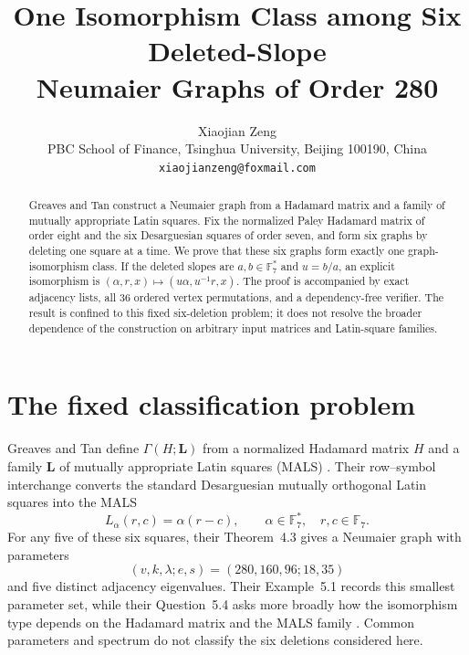 \documentclass[11pt]{article}
\title{One Isomorphism Class among Six Deleted-Slope\\
Neumaier Graphs of Order 280}
\author{Xiaojian Zeng\\
\small PBC School of Finance, Tsinghua University, Beijing 100190, China\\
\small \texttt{xiaojianzeng@foxmail.com}}
\date{}\hypersetup{pdftitle={One Isomorphism Class among Six Deleted-Slope Neumaier Graphs of Order 280},pdfauthor={Xiaojian Zeng}}
\newcommand{\F}{\mathbb F}
\begin{document}
\maketitle

\begin{abstract}
Greaves and Tan construct a Neumaier graph from a Hadamard matrix and a
family of mutually appropriate Latin squares.  Fix the normalized Paley
Hadamard matrix of order eight and the six Desarguesian squares of order
seven, and form six graphs by deleting one square at a time.  We prove that
these six graphs form exactly one graph-isomorphism class.  If the deleted
slopes are $a,b\in\F_7^*$ and $u=b/a$, an explicit isomorphism is
$(\alpha,r,x)\mapsto(u\alpha,u^{-1}r,x)$.  The proof is accompanied by exact
adjacency lists, all 36 ordered vertex permutations, and a dependency-free
verifier.  The result is confined to this fixed six-deletion problem; it does
not resolve the broader dependence of the construction on arbitrary input
matrices and Latin-square families.
\end{abstract}

\section{The fixed classification problem}

Greaves and Tan define $\Gamma(H;\mathbf L)$ from a normalized Hadamard
matrix $H$ and a family $\mathbf L$ of mutually appropriate Latin squares
(MALS) \cite{GreavesTan2026}.  Their row--symbol interchange converts the
standard Desarguesian mutually orthogonal Latin squares into the MALS
\begin{equation}\label{eq:latin}
 L_\alpha(r,c)=\alpha(r-c),
 \qquad \alpha\in\F_7^*,\quad r,c\in\F_7.
\end{equation}
For any five of these six squares, their Theorem~4.3 gives a Neumaier graph
with parameters
\[
 (v,k,\lambda;e,s)=(280,160,96;18,35)
\]
and five distinct adjacency eigenvalues.  Their Example~5.1 records this
smallest parameter set, while their Question~5.4 asks more broadly how the
isomorphism type depends on the Hadamard matrix and the MALS family
\cite{GreavesTan2026}.  Common parameters and spectrum do not classify the
six deletions considered here.
\end{document}
